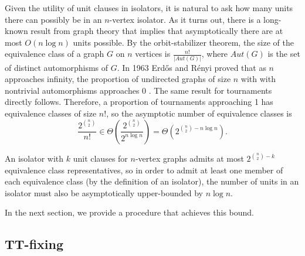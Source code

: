 \documentclass[conference]{IEEEtran}
\begin{document}

Given the utility of unit clauses in isolators, it is natural to ask how many units there can possibly be in an $n$-vertex isolator. As it turns out, there is a long-known result from graph theory that implies that asymptotically there are at most $O(n\log n)$ units possible. By the orbit-stabilizer theorem, the size of the equivalence class of a graph $G$ on $n$ vertices is $\frac{n!}{|Aut(G)|}$, where $Aut(G)$ is the set of distinct automorphisms of $G$. In 1963 Erd\H{o}s and R{\'e}nyi proved that as $n$ approaches infinity, the proportion of undirected graphs of size $n$ with with nontrivial automorphisms approaches 0 \cite{ref_asymmetric}. The same result for tournaments directly follows. Therefore, a proportion of tournaments approaching 1 has equivalence classes of size $n!$, so the asymptotic number of equivalence classes is
\[
\frac{2^{n \choose 2}}{n!} \in \Theta(\frac{2^{n \choose 2}}{2^{n\log n}}) = \Theta(2^{{n \choose 2} - n\log n}).
\]

An isolator with $k$ unit clauses for $n$-vertex graphs admits at most $2^{{n \choose 2} - k}$ equivalence class representatives, so in order to admit at least one member of each equivalence class (by the definition of an isolator), the number of units in an isolator must also be asymptotically upper-bounded by $n \log n$.

In the next section, we provide a procedure that achieves this bound.

\subsection{TT-fixing}
\end{document}
